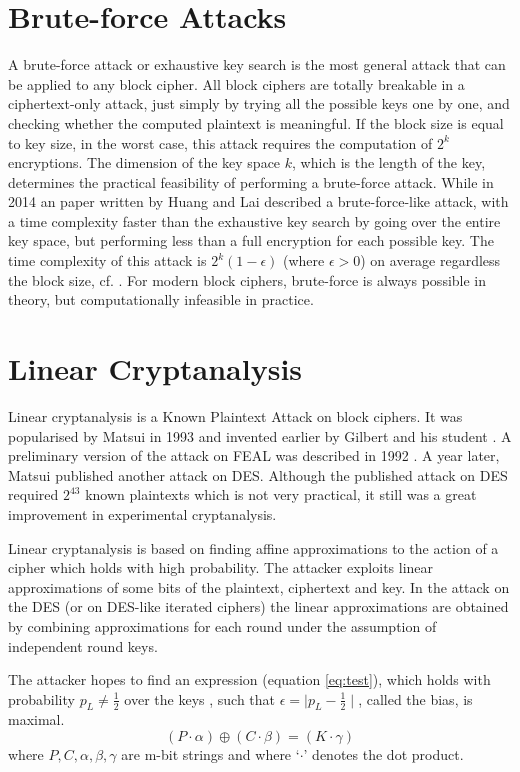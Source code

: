 \section{Brute-force Attacks}
A brute-force attack or exhaustive key search is the most general attack that can be applied to any block cipher. All block ciphers are totally breakable in a ciphertext-only attack, just simply by trying all the possible keys one by one, and checking whether the computed plaintext is meaningful. If the block size is equal to key size, in the worst case, this attack requires the computation of $2^{k}$ encryptions. The dimension of the key space $k$, which is the length of the key, determines the practical feasibility of performing a brute-force attack. While in 2014 an paper written by Huang and Lai \cite{huang2014effective} described a brute-force-like attack, with a time complexity faster than the exhaustive key search by going over the entire key space, but performing less than a full encryption for each possible key. The time complexity of this attack is $2^k(1 - \epsilon)$ (where $\epsilon > 0$) on average regardless the block size, cf. \cite{huang2014effective,gostac}. For modern block ciphers, brute-force is always possible in theory, but computationally infeasible in practice.
\section{Linear Cryptanalysis}
Linear cryptanalysis is a Known Plaintext Attack on block ciphers. It was popularised by Matsui in 1993 \cite{matsui1994linear} and invented earlier by Gilbert and his student \cite{tardy1991known}. A preliminary version of the attack on FEAL was described in 1992 \cite{matsui1993new}. A year later, Matsui published another attack on DES\cite{matsui1994linear}. Although the published attack on DES required $2^{43}$ known plaintexts which is not very practical, it still was a great improvement in experimental cryptanalysis. 

Linear cryptanalysis is based on finding affine approximations to the action of a cipher which holds with high probability. The attacker exploits linear approximations of some bits of the plaintext, ciphertext and key. In the attack on the DES (or on DES-like iterated ciphers) the linear approximations are obtained by combining approximations for each round under the assumption of independent round keys. 

The attacker hopes to find an expression (equation \ref{eq:test}), which holds with probability $p_{L} \neq \frac{1}{2}$ over the keys \cite{matsui1994linear}, such that $\epsilon = \mid p_{L} - \frac{1}{2} \mid$, called the bias, is maximal. 
\begin{equation} \label{eq:test}
(P\cdot\alpha)\oplus(C\cdot\beta)=(K\cdot\gamma)
\end{equation}
where $P,C,\alpha,\beta,\gamma$ are m-bit strings and where `$\cdot$' denotes the dot product.

